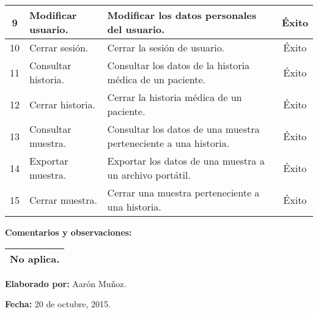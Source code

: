 \begin{table}[h]
\begin{tabulary}{\anchotabla}{|c|L|J|c|}
			9 & Modificar usuario. & Modificar los datos personales del usuario. & \'{E}xito \\ \hline
			
			10 & Cerrar sesi\'{o}n. & Cerrar la sesi\'{o}n de usuario. & \'{E}xito \\ \hline
			
			11 & Consultar historia. & Consultar los datos de la historia m\'{e}dica de un paciente. & \'{E}xito \\ \hline
			
			12 & Cerrar historia. & Cerrar la historia m\'{e}dica de un paciente. & \'{E}xito \\ \hline
			
			13 & Consultar muestra. & Consultar los datos de una muestra perteneciente a una historia. & \'{E}xito \\ \hline
			
			14 & Exportar muestra. & Exportar los datos de una muestra a un archivo port\'{a}til. & \'{E}xito \\ \hline
			
			15 & Cerrar muestra. & Cerrar una muestra perteneciente a una historia. & \'{E}xito \\ \hline

	\end{tabulary}
\end{table}
\newpage
\FloatBarrier
\textbf{Comentarios y observaciones:}
\begin{table}[H]
	\centering
	\setlength{\extrarowheight}{\altocelda}
	\begin{tabularx}{\anchotabla}{|X|}
		\hline
		No aplica.
		\\ \hline
	\end{tabularx}
\end{table}

\begin{minipage}[t]{0.45\textwidth}
	\begin{flushleft}
		\textbf{Elaborado por:} Aar\'{o}n Mu\~{n}oz.
	\end{flushleft}
\end{minipage}
\begin{minipage}[t]{0.45\textwidth}
	\begin{flushright}
		\begin{center}
			\textbf{Fecha:} 20 de octubre, 2015.
		\end{center}
	\end{flushright}
\end{minipage}
\vfill

